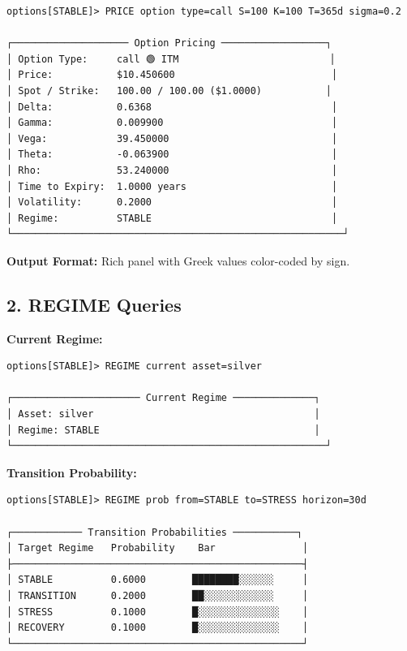 \documentclass[12pt,oneside,openany]{book}
\begin{document}
\begin{lstlisting}
options[STABLE]> PRICE option type=call S=100 K=100 T=365d sigma=0.2

┌──────────────────── Option Pricing ──────────────────┐
│ Option Type:     call 🟢 ITM                          │
│ Price:           $10.450600                           │
│ Spot / Strike:   100.00 / 100.00 ($1.0000)           │
│ Delta:           0.6368                               │
│ Gamma:           0.009900                             │
│ Vega:            39.450000                            │
│ Theta:           -0.063900                            │
│ Rho:             53.240000                            │
│ Time to Expiry:  1.0000 years                         │
│ Volatility:      0.2000                               │
│ Regime:          STABLE                               │
└─────────────────────────────────────────────────────────┘
\end{lstlisting}

\textbf{Output Format:} Rich panel with Greek values color-coded by sign.

\subsection{2. REGIME Queries}

\textbf{Current Regime:}

\begin{lstlisting}
options[STABLE]> REGIME current asset=silver

┌────────────────────── Current Regime ──────────────┐
│ Asset: silver                                      │
│ Regime: STABLE                                     │
└──────────────────────────────────────────────────────┘
\end{lstlisting}

\textbf{Transition Probability:}

\begin{lstlisting}
options[STABLE]> REGIME prob from=STABLE to=STRESS horizon=30d

┌──────────── Transition Probabilities ───────────┐
│ Target Regime   Probability    Bar               │
├──────────────────────────────────────────────────┤
│ STABLE          0.6000        ████████░░░░░░     │
│ TRANSITION      0.2000        ██░░░░░░░░░░░░     │
│ STRESS          0.1000        █░░░░░░░░░░░░░░    │
│ RECOVERY        0.1000        █░░░░░░░░░░░░░░    │
└──────────────────────────────────────────────────┘
\end{lstlisting}
\end{document}
